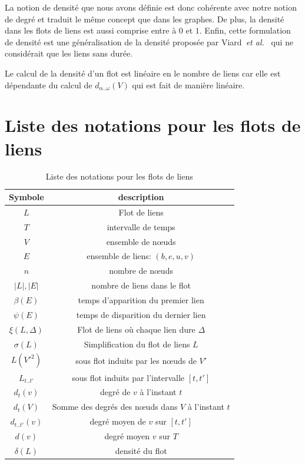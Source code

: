 La notion de densité que nous avons définie est donc cohérente avec notre notion de degré et traduit le même concept que dans les graphes.
De plus, la densité dans les flots de liens est aussi comprise entre à $0$ et $1$.
Enfin, cette formulation de densité est une généralisation de la densité proposée par Viard~\emph{et al.}~\cite{Viard2014a} qui ne considérait que les liens sans durée.

Le calcul de la densité d'un flot est linéaire en le nombre de liens car elle est dépendante du calcul de $d_{\alpha..\omega}(V)$  qui est fait de manière linéaire.
\clearpage
\section*{Liste des notations pour les flots de liens}
\begin{table}[h]
	\centering
	\begin{tabular}{|c|c|}
	\hline Symbole & description \\
	\hline $L$ & Flot de liens \\ 
	$T$ & intervalle de temps  \\
	$V$ & ensemble de n\oe uds\\
	$E$ & ensemble de liens: $(b,e,u,v)$ \\
	$n$ & nombre de n\oe uds  \\
	$|L|,|E|$ & nombre de liens dans le flot \\
	$\beta(E)$ & temps d'apparition du premier lien\\
	$\psi(E)$ & temps de disparition du dernier lien\\
	$\xi(L,\Delta)$ & Flot de liens où chaque lien dure $\Delta$\\
	$\sigma(L)$ & Simplification du flot de liens $L$\\
	$L(V'^2)$ & sous flot induits par les n\oe uds de $V'$ \\
	$L_{t..t'}$ & sous flot induits par l'intervalle $[t,t']$ \\
	$d_t(v)$ & degré de $v$ à l'instant $t$\\
	$d_t(V)$ & Somme des degrés des n\oe uds dans $V$ à l'instant $t$\\
	$d_{t..t'}(v)$ & degré moyen de $v$ sur $[t,t']$\\
	$d(v)$ & degré moyen $v$ sur $T$\\
	$\delta(L)$ & densité du flot\\
	\hline
	\end{tabular} 
		\caption{Liste des notations pour les flots de liens}
\end{table}

